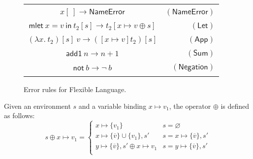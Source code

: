 \documentclass[preprint,authoryear,sort&compress,9pt,nocopyrightspace]{article}
\newcommand\rulename[1]{\mathsf{(#1)}}
\newcommand{\tto}{\longrightarrow}
\newcommand{\conf}[2][s]{(#2)[#1]}
\newcommand{\confext}[1]{#1 [x \mapsto v \oplus s]}
\newcommand{\oletP}[3]{\mathsf{mlet} \ x = #2 \ \mathsf{in}  \ #3}
\newcommand{\absST}[2]{\lambda #1. \ #2}
\newcommand{\negacion}[1]{\mathsf{not} \ #1}
\newcommand{\suma}[1]{\mathsf{add1} \ #1}
\newcommand{\nameerror}{\mathsf{NameError}}
\newcommand{\semanticA}{Flexible Language}
\begin{document}
\begin{figure}[h]
\begin{small}
\begin{center}
\begin{tabular}{|c r|}
\hline
&\\
$x[ \ ] \tto \nameerror$&$\rulename{NameError}  $\\
&\\
${\oletP{T_1}{v}{t_2[s]} \tto \confext{t_2}}$&$\rulename{Let} $\\
&\\
$\conf{\absST{x}{t_2}} \ v \tto \conf{[x \mapsto v]{t_2}}$&$\rulename{App}$\\
&\\
$\suma{n} \tto n + 1$&$\rulename{Sum}$\\
&\\
$\negacion{b} \tto \neg \ b $&$\rulename{Negation}$\\
&\\
\hline
\end{tabular}
\caption{Error rules for \semanticA.}
\label{tabla:rules1errors}
\end{center}
\end{small}
\end{figure}


\begin{definition}[$\oplus$]
\label{definition:tcs}
\mbox{}
Given an environment  $s$ and a variable binding $x \mapsto v_1$, the operator $\oplus$ is defined  as follows:
\[ s \oplus x \mapsto v_1 = \begin{cases} 
      x \mapsto \{v_1\}& s =  \varnothing \\
      x \mapsto \{\overline{v}\} \cup \{v_1\}, s' & s = x \mapsto \{\overline{v }\}, s'\\
      y \mapsto \{\overline{v}\}, s' \oplus x \mapsto v_1 & s = y \mapsto \{\overline{v}\}, s'\\
   \end{cases}
\]
\end{definition}
\end{document}
